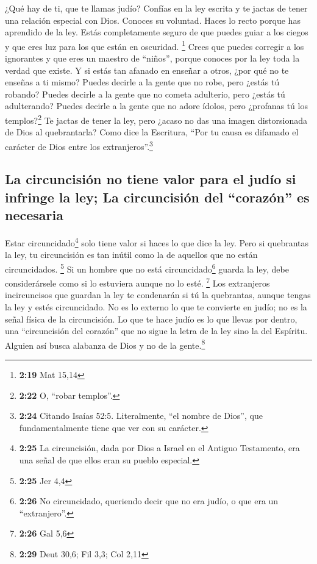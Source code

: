  ¿Qué hay de ti, que te llamas judío? Confías en la ley
escrita y te jactas de tener una relación especial con Dios.
 Conoces su voluntad. Haces lo recto porque has aprendido
de la ley.  Estás completamente seguro de que puedes
guiar a los ciegos y que eres luz para los que están en oscuridad.
\footnote{\textbf{2:19} Mat 15,14}  Crees que puedes
corregir a los ignorantes y que eres un maestro de ``niños'', porque
conoces por la ley toda la verdad que existe.  Y si estás
tan afanado en enseñar a otros, ¿por qué no te enseñas a ti mismo?
Puedes decirle a la gente que no robe, pero ¿estás tú robando?
 Puedes decirle a la gente que no cometa adulterio, pero
¿estás tú adulterando? Puedes decirle a la gente que no adore ídolos,
pero ¿profanas tú los templos?\footnote{\textbf{2:22} O, ``robar
  templos''.}  Te jactas de tener la ley, pero ¿acaso no
das una imagen distorsionada de Dios al quebrantarla? 
Como dice la Escritura, ``Por tu causa es difamado el carácter de Dios
entre los extranjeros''.\footnote{\textbf{2:24} Citando Isaías 52:5.
  Literalmente, ``el nombre de Dios'', que fundamentalmente tiene que
  ver con su carácter.}

\hypertarget{la-circuncisiuxf3n-no-tiene-valor-para-el-juduxedo-si-infringe-la-ley-la-circuncisiuxf3n-del-corazuxf3n-es-necesaria}{%
\subsection{La circuncisión no tiene valor para el judío si infringe la
ley; La circuncisión del ``corazón'' es
necesaria}\label{la-circuncisiuxf3n-no-tiene-valor-para-el-juduxedo-si-infringe-la-ley-la-circuncisiuxf3n-del-corazuxf3n-es-necesaria}}

 Estar circuncidado\footnote{\textbf{2:25} La
  circuncisión, dada por Dios a Israel en el Antiguo Testamento, era una
  señal de que ellos eran su pueblo especial.} solo tiene valor si haces
lo que dice la ley. Pero si quebrantas la ley, tu circuncisión es tan
inútil como la de aquellos que no están circuncidados. \footnote{\textbf{2:25}
  Jer 4,4}  Si un hombre que no está
circuncidado\footnote{\textbf{2:26} No circuncidado, queriendo decir que
  no era judío, o que era un ``extranjero''.} guarda la ley, debe
considerársele como si lo estuviera aunque no lo esté. \footnote{\textbf{2:26}
  Gal 5,6}  Los extranjeros incircuncisos que guardan la
ley te condenarán si tú la quebrantas, aunque tengas la ley y estés
circuncidado.  No es lo externo lo que te convierte en
judío; no es la señal física de la circuncisión.  Lo que
te hace judío es lo que llevas por dentro, una ``circuncisión del
corazón'' que no sigue la letra de la ley sino la del Espíritu. Alguien
así busca alabanza de Dios y no de la gente.\footnote{\textbf{2:29} Deut
  30,6; Fil 3,3; Col 2,11}

